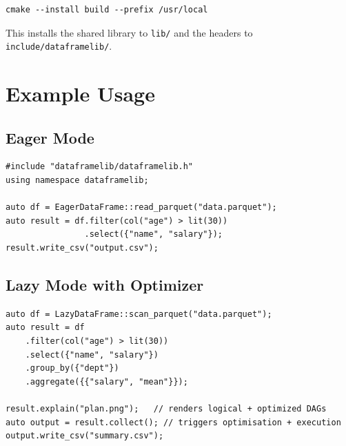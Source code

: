 \documentclass[12pt,a4paper]{article}
\begin{document}
\begin{verbatim}
cmake --install build --prefix /usr/local
\end{verbatim}

This installs the shared library to \texttt{lib/} and the headers to
\texttt{include/dataframelib/}.

\section{Example Usage}

\subsection{Eager Mode}

\begin{lstlisting}
#include "dataframelib/dataframelib.h"
using namespace dataframelib;

auto df = EagerDataFrame::read_parquet("data.parquet");
auto result = df.filter(col("age") > lit(30))
                .select({"name", "salary"});
result.write_csv("output.csv");
\end{lstlisting}

\subsection{Lazy Mode with Optimizer}

\begin{lstlisting}
auto df = LazyDataFrame::scan_parquet("data.parquet");
auto result = df
    .filter(col("age") > lit(30))
    .select({"name", "salary"})
    .group_by({"dept"})
    .aggregate({{"salary", "mean"}});

result.explain("plan.png");   // renders logical + optimized DAGs
auto output = result.collect(); // triggers optimisation + execution
output.write_csv("summary.csv");
\end{lstlisting}
\end{document}
